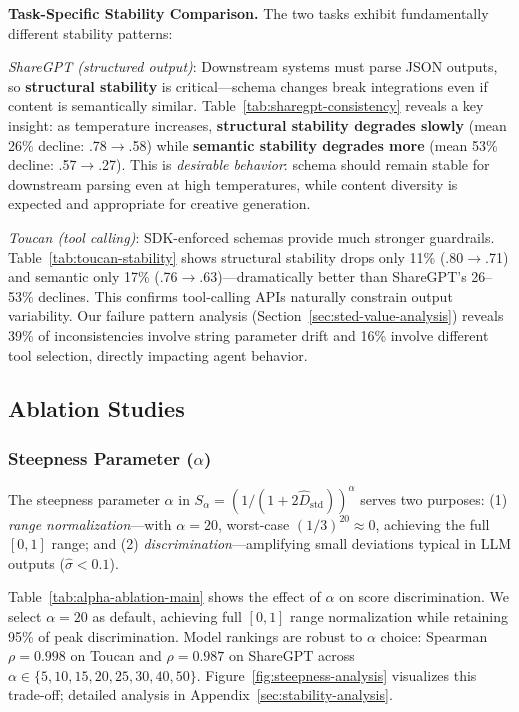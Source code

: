 \documentclass{article}
\theoremstyle{plain}
\theoremstyle{definition}
\begin{document}
\textbf{Task-Specific Stability Comparison.} The two tasks exhibit fundamentally different stability patterns:

\textit{ShareGPT (structured output)}: Downstream systems must parse JSON outputs, so \textbf{structural stability} is critical---schema changes break integrations even if content is semantically similar. Table~\ref{tab:sharegpt-consistency} reveals a key insight: as temperature increases, \textbf{structural stability degrades slowly} (mean 26\% decline: .78$\to$.58) while \textbf{semantic stability degrades more} (mean 53\% decline: .57$\to$.27). This is \textit{desirable behavior}: schema should remain stable for downstream parsing even at high temperatures, while content diversity is expected and appropriate for creative generation.

\textit{Toucan (tool calling)}: SDK-enforced schemas provide much stronger guardrails. Table~\ref{tab:toucan-stability} shows structural stability drops only 11\% (.80$\to$.71) and semantic only 17\% (.76$\to$.63)---dramatically better than ShareGPT's 26--53\% declines. This confirms tool-calling APIs naturally constrain output variability. Our failure pattern analysis (Section~\ref{sec:sted-value-analysis}) reveals 39\% of inconsistencies involve string parameter drift and 16\% involve different tool selection, directly impacting agent behavior.

\subsection{Ablation Studies}

\subsubsection{Steepness Parameter ($\alpha$)}
\label{sec:ablation-steepness}

The steepness parameter $\alpha$ in $S_\alpha = (1/(1+2\hat{D}_{\text{std}}))^\alpha$ serves two purposes: (1) \textit{range normalization}---with $\alpha = 20$, worst-case $(1/3)^{20} \approx 0$, achieving the full $[0, 1]$ range; and (2) \textit{discrimination}---amplifying small deviations typical in LLM outputs ($\hat{\sigma} < 0.1$).

Table~\ref{tab:alpha-ablation-main} shows the effect of $\alpha$ on score discrimination. We select $\alpha = 20$ as default, achieving full $[0,1]$ range normalization while retaining 95\% of peak discrimination. Model rankings are robust to $\alpha$ choice: Spearman $\rho = 0.998$ on Toucan and $\rho = 0.987$ on ShareGPT across $\alpha \in \{5, 10, 15, 20, 25, 30, 40, 50\}$. Figure~\ref{fig:steepness-analysis} visualizes this trade-off; detailed analysis in Appendix~\ref{sec:stability-analysis}.
\end{document}
